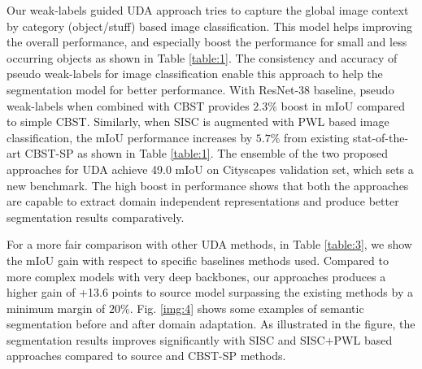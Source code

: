 \documentclass[10pt,twocolumn,letterpaper]{article}
\begin{document}
Our weak-labels guided UDA approach tries to capture the global image context by category (object/stuff) based image classification. This model helps improving the overall performance, and especially boost the performance for small and less occurring objects as shown in Table \ref{table:1}. The consistency and accuracy of pseudo weak-labels for image classification enable this approach to help the segmentation model for better performance. With ResNet-38 baseline, pseudo weak-labels when combined with CBST \cite{zou2018unsupervised} provides $2.3\%$ boost in mIoU compared to simple CBST. Similarly, when SISC is augmented with PWL based image classification, the mIoU performance increases by $5.7\%$ from existing stat-of-the-art CBST-SP \cite{zou2018unsupervised} as shown in Table \ref{table:1}. The ensemble of the two proposed approaches for UDA achieve 49.0 mIoU on Cityscapes validation set, which sets a new benchmark. The high boost in performance shows that both the approaches are capable to extract domain independent representations and produce better segmentation results comparatively. 


For a more fair comparison with other UDA methods, in Table \ref{table:3}, we show the mIoU gain with respect to specific baselines methods used. Compared to more complex models with very deep backbones, our approaches produces a higher gain of +13.6 points to source model surpassing the existing methods by a minimum margin of $20\%$.
Fig. \ref{img:4} shows some examples of semantic segmentation before and after domain adaptation. As illustrated in the figure, the segmentation results improves significantly with SISC and SISC+PWL based approaches compared to source and CBST-SP methods.  
\end{document}
